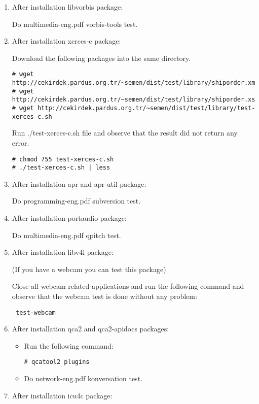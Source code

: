 \documentclass[a4paper,10pt]{article}
\begin{document}
\begin{enumerate}
\item After installation libvorbis package:

Do multimedia-eng.pdf vorbis-tools test.

\item After installation xerces-c package:

Download the following packages into the same directory.
\begin{verbatim}
# wget http://cekirdek.pardus.org.tr/~semen/dist/test/library/shiporder.xml
# wget http://cekirdek.pardus.org.tr/~semen/dist/test/library/shiporder.xsd
# wget http://cekirdek.pardus.org.tr/~semen/dist/test/library/test-xerces-c.sh
\end{verbatim}

Run ./test-xerces-c.sh file and observe that the result did not return any error.
\begin{verbatim}
# chmod 755 test-xerces-c.sh
# ./test-xerces-c.sh | less
\end{verbatim}

\item After installation apr and apr-util package:

Do programming-eng.pdf subversion test.

\item After installation portaudio package:

Do multimedia-eng.pdf qpitch test.

\item After installation libv4l package: 

(If you have a webcam you can test this package)

Close all webcam related applications and run the following command and observe that the webcam test is done without any problem:
\begin{verbatim}
 test-webcam
\end{verbatim}

\item After installation qca2 and qca2-apidocs packages:
\begin{itemize}
 \item Run the following command:
\begin{verbatim}
# qcatool2 plugins 
\end{verbatim}
\item Do network-eng.pdf konversation test.
\end{itemize}


\item After installation icu4c package:


\end{enumerate}
\end{document}
